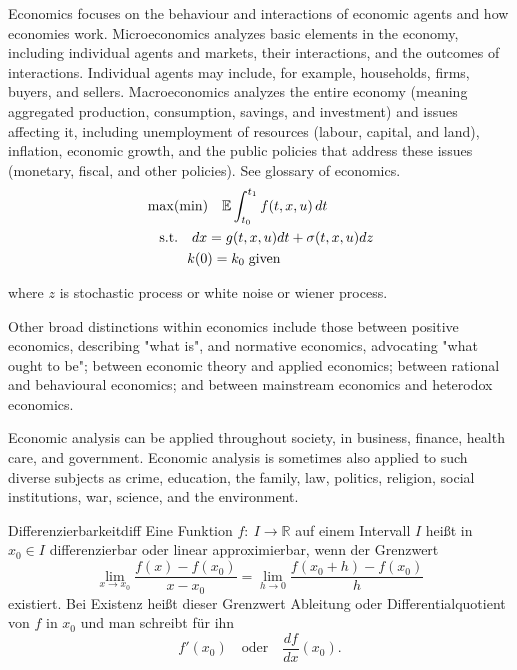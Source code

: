 \documentclass[titlestyle=hang,11pt]{elegantbook}
\begin{document}
Economics focuses on the behaviour and interactions of economic agents and how economies work. Microeconomics analyzes basic elements in the economy, including individual agents and markets, their interactions, and the outcomes of interactions. Individual agents may include, for example, households, firms, buyers, and sellers. Macroeconomics analyzes the entire economy (meaning aggregated production, consumption, savings, and investment) and issues affecting it, including unemployment of resources (labour, capital, and land), inflation, economic growth, and the public policies that address these issues (monetary, fiscal, and other policies). See glossary of economics.
\begin{align*}
   &\max(\min)\quad \mathbb{E}\int_{t_0}^{t_1}f(t,x,u)\,dt\\
   &\quad\mbox{s.t.} \quad dx=g(t,x,u)dt+\sigma(t,x,u)dz\\
   &\quad \hspace{2.em} k(0)=k_0\;\text{given}
\end{align*}

where $z$ is stochastic process or white noise or wiener process.

Other broad distinctions within economics include those between positive economics, describing "what is", and normative economics, advocating "what ought to be"; between economic theory and applied economics; between rational and behavioural economics; and between mainstream economics and heterodox economics.

Economic analysis can be applied throughout society, in business, finance, health care, and government. Economic analysis is sometimes also applied to such diverse subjects as crime, education, the family, law, politics, religion, social institutions, war, science, and the environment.

\begin{definition}{Differenzierbarkeit}{diff}
Eine Funktion $f:~I\to\mathbb{R}$ auf einem Intervall $I$ hei\ss{}t in $x_0\in I$ differenzierbar oder linear approximierbar, wenn der Grenzwert
   \begin{equation*}
      \lim\limits_{x\to x_0}\frac{f(x)-f(x_0)}{x-x_0}=
      \lim\limits_{h\to 0}\frac{f(x_0+h)-f(x_0)}{h}
   \end{equation*}
existiert. Bei Existenz hei\ss{}t dieser Grenzwert Ableitung oder Differentialquotient von $f$ in $x_0$ und man schreibt f\"{u}r ihn
   \begin{equation*}
      f'(x_0)\quad\text{oder}\quad\frac{df}{dx}(x_0).
   \end{equation*}
\end{definition}
\end{document}

